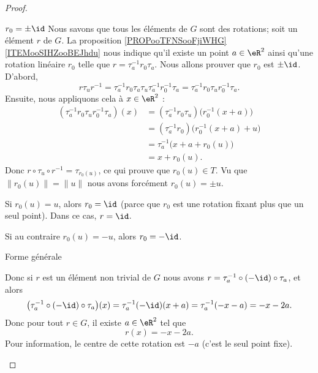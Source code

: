 \begin{proof}
\begin{subproof}
            \begin{subproof}
                \item[\( r_0=\pm\id\)]
                    Nous savons que tous les éléments de \( G\) sont des rotations; soit un élément \( r\) de \( G\). La proposition
                    \ref{PROPooTFNSooFjiWHG}\ref{ITEMooSIHZooBEJhdu} nous indique qu'il existe un point \( a\in \eR^2\) ainsi qu'une rotation linéaire \( r_0\) telle que \( r=\tau_a^{-1}r_0\tau_a\). Nous allons prouver que \( r_0\) est \( \pm\id\). D'abord,
                    \begin{equation}
                        r\tau_u r^{-1}=\tau_a^{-1}r_0\tau_a\tau_u\tau_a^{-1}r_0^{-1}\tau_a=\tau_a^{-1}r_0\tau_ur_0^{-1}\tau_a.
                    \end{equation}
                    Ensuite, nous appliquons cela à \( x\in \eR^2\) :
                    \begin{subequations}
                        \begin{align}
                            (\tau_a^{-1}r_0\tau_ur_0^{-1}\tau_a)(x)&=(\tau_a^{-1}r_0\tau_u)\big( r_0^{-1}(x+a) \big)\\
                            &=(\tau_a^{-1}r_0)\big( r_0^{-1}(x+a)+u \big)\\
                            &=\tau_a^{-1}\big( x+a+r_0(u) \big)\\
                            &=x+r_0(u).
                        \end{align}
                    \end{subequations}
                    Donc \( r\circ\tau_u\circ r^{-1}=\tau_{r_0(u)}\), ce qui prouve que \( r_0(u)\in T\). Vu que \( \| r_0(u) \|=\| u \|\) nous avons forcément \( r_0(u)=\pm u\).

                    Si \( r_0(u)=u\), alors \( r_0=\id\) (parce que \( r_0\) est une rotation fixant plus que un seul point). Dans ce cas, \( r=\id\).

                    Si au contraire \( r_0(u)=-u\), alors \( r_0=-\id\).

                \item[Forme générale]

                    Donc si \( r\) est un élément non trivial de \( G\) nous avons \( r=\tau_a^{-1}\circ(-\id)\circ\tau_a\), et alors
                    \begin{equation}
                        \big( \tau_a^{-1}\circ(-\id)\circ\tau_a \big)(x)=\tau_a^{-1}  (-\id)(x+a)=\tau_a^{-1}(-x-a)=-x-2a.
                    \end{equation}
                    Donc pour tout \( r\in G\), il existe \( a\in \eR^2\) tel que
                    \begin{equation}        \label{EQooQGNVooKyCCYW}
                        r(x)=-x-2a.
                    \end{equation}
                    Pour information, le centre de cette rotation est \( -a\) (c'est le seul point fixe).


\end{subproof}
\end{subproof}
\end{proof}
